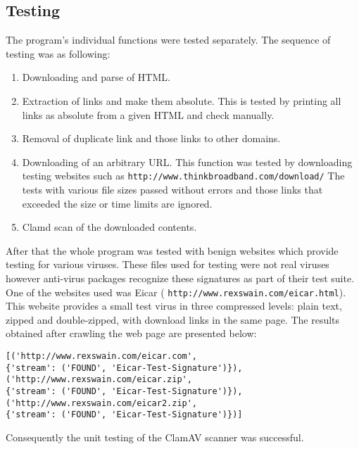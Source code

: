 \subsection{Testing}
The program's individual functions were tested separately. The sequence of 
testing was as following:
\begin{enumerate}
\item Downloading and parse of HTML.
\item Extraction of links and make them absolute.
This is tested by printing all links as absolute from a given HTML and check 
manually.
\item Removal of duplicate link and those links to other domains.
\item Downloading of an arbitrary URL.
This function was tested by downloading testing websites such as
\verb`http://www.thinkbroadband.com/download/`
The tests with various file 
sizes passed without errors and those links that exceeded the size or time limits are 
ignored. 
\item Clamd scan of the downloaded contents. 
\end{enumerate}
After that the whole program was tested with benign websites which provide 
testing for various viruses. These files used for testing were not real viruses however anti-virus packages recognize these signatures 
as part of their test suite. 
One of the websites used was Eicar (
\verb`http://www.rexswain.com/eicar.html`). This website provides a small test 
virus in three compressed levels: plain text, zipped and double-zipped, with 
download links in the same page. The results obtained after 
crawling the web page are presented below:
\begin{verbatim}
[('http://www.rexswain.com/eicar.com', 
{'stream': ('FOUND', 'Eicar-Test-Signature')}), 
('http://www.rexswain.com/eicar.zip', 
{'stream': ('FOUND', 'Eicar-Test-Signature')}), 
('http://www.rexswain.com/eicar2.zip', 
{'stream': ('FOUND', 'Eicar-Test-Signature')})]
\end{verbatim}
Consequently the unit testing of the ClamAV scanner was successful. 
